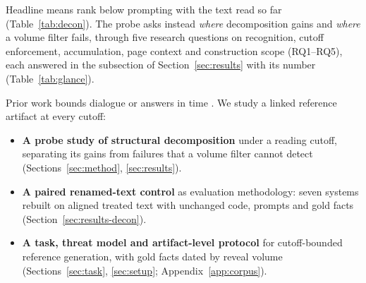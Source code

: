Headline means rank \sys below prompting with the text read so far
(Table~\ref{tab:decon}). The probe asks instead \emph{where} decomposition gains and
\emph{where} a volume filter fails, through five research questions on recognition,
cutoff enforcement, accumulation, page context and construction scope (RQ1--RQ5), each
answered in the subsection of Section~\ref{sec:results} with its number
(Table~\ref{tab:glance}).


Prior work bounds dialogue or answers in time \citep{ahn2024timechara,huang2025living}.
We study a linked reference artifact at every cutoff:
\begin{itemize}[leftmargin=*,itemsep=0pt,topsep=2pt]
  \item \textbf{A probe study of structural decomposition} under a reading cutoff,
    separating its gains from failures that a volume filter cannot detect
    (Sections~\ref{sec:method}, \ref{sec:results}).
  \item \textbf{A paired renamed-text control} as evaluation methodology: seven systems
    rebuilt on aligned treated text with unchanged code, prompts and gold facts
    (Section~\ref{sec:results-decon}).
  \item \textbf{A task, threat model and artifact-level protocol} for cutoff-bounded
    reference generation, with  gold facts dated by reveal volume
    (Sections~\ref{sec:task}, \ref{sec:setup}; Appendix~\ref{app:corpus}).
\end{itemize}
